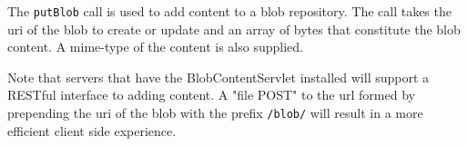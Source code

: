 The \verb+putBlob+ call is used to add content to a blob repository. The call
takes the uri of the blob to create or update and an array of bytes that constitute the blob
content. A mime-type of the content is also supplied.

Note that \Rapture servers that have the BlobContentServlet installed will support a RESTful interface
to adding content. A "file POST" to the url formed by prepending the uri of the blob with the prefix
\verb+/blob/+ will result in a more efficient client side experience.
